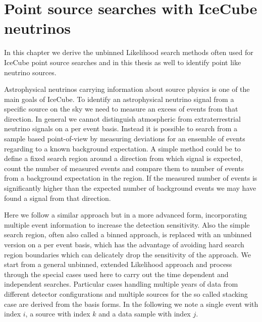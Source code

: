 \chapter{Point source searches with IceCube neutrinos}
In this chapter we derive the unbinned Likelihood search methods often used for IceCube point source searches and in this thesis as well to identify point like neutrino sources.

Astrophysical neutrinos carrying information about source physics is one of the main goals of IceCube.
To identify an astrophysical neutrino signal from a specific source on the sky we need to measure an excess of events from that direction.
In general we cannot distinguish atmospheric from extraterrestrial neutrino signals on a per event basis.
Instead it is possible to search from a sample based point-of-view by measuring deviations for an ensemble of events regarding to a known background expectation.
A simple method could be to define a fixed search region around a direction from which signal is expected, count the number of measured events and compare them to number of events from a background expectation in the region.
If the measured number of events is significantly higher than the expected number of background events we may have found a signal from that direction.

Here we follow a similar approach but in a more advanced form, incorporating multiple event information to increase the detection sensitivity.
Also the simple search region, often also called a binned approach, is replaced with an unbinned version on a per event basis, which has the advantage of avoiding hard search region boundaries which can delicately drop the sensitivity of the approach.
We start from a general unbinned, extended Likelihood approach and process through the special cases used here to carry out the time dependent and independent searches.
Particular cases handling multiple years of data from different detector configurations and multiple sources for the so called stacking case are derived from the basis forms.
In the following we note a single event with index $i$, a source with index $k$ and a data sample with index $j$.


